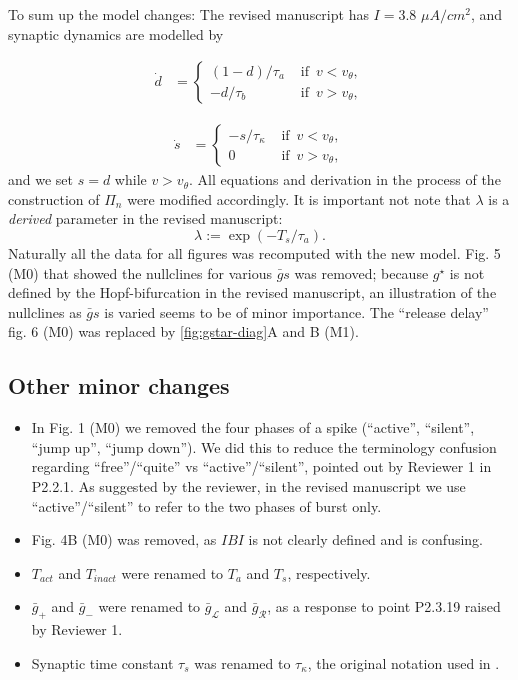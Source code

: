 \documentclass[utf8]{article}
\newcounter{point}[section]
\begin{document}
To sum up the model changes:
The revised manuscript has $I=3.8$ $\si{\mu A/cm^2}$, and synaptic dynamics are modelled by

\begin{align*}
	\dot d & =
	\begin{cases}
		(1-d)/\tau_{a} & \text{ if }\, v<v_{\theta}, \\
		-d/\tau_{b}    & \text{ if }\, v>v_{\theta},
	\end{cases}
\end{align*}

\begin{align*}
	\dot s & =
	\begin{cases}
		-s/\tau_{\kappa} & \text{ if }\, v<v_{\theta}, \\
		0                & \text{ if }\, v>v_{\theta},
	\end{cases}
\end{align*}
and we set $s=d$ while $v>v_{\theta}$.
All equations and derivation in the process of the construction of $\Pi_n$ were modified accordingly.
It is important not note that $\lambda$ is a \textit{derived} parameter in the revised manuscript:
\begin{equation}
\lambda := \exp(-T_s/\tau_a).
\end{equation}
Naturally all the data for all figures was recomputed with the new model.
Fig. 5 (M0) that showed the nullclines for various $\bar g s$ was removed;
because $g^\star$ is not defined by the Hopf-bifurcation in the revised manuscript, an illustration of the nullclines as $\bar g s$ is varied seems to be of minor importance.
The ``release delay'' fig. 6 (M0) was replaced by \cref{fig:gstar-diag}A and B (M1).

\subsection{Other minor changes}

\begin{itemize}
\item In Fig. 1 (M0) we removed the four phases of a spike (``active'', ``silent'', ``jump up'', ``jump down''). We did this to reduce the terminology confusion regarding ``free''/``quite'' vs ``active''/``silent'', pointed out by Reviewer 1 in P2.2.1. As suggested by the reviewer, in the revised manuscript we use ``active''/``silent'' to refer to the two phases of burst only.
\item Fig. 4B (M0) was removed, as $IBI$ is not clearly defined and is confusing.
\item $T_{act}$ and $T_{inact}$ were renamed to $T_a$ and $T_s$, respectively.
\item $\bar g_{+}$ and $\bar g_{-}$ were renamed to $\bar g_{\mathcal{L}}$ and $\bar g_{\mathcal{R}}$, as a response to point P2.3.19 raised by Reviewer 1.
\item Synaptic time constant $\tau_{s}$ was renamed to $\tau_{\kappa}$, the original notation used in \cite{bose2011}.
\end{itemize}
\end{document}
